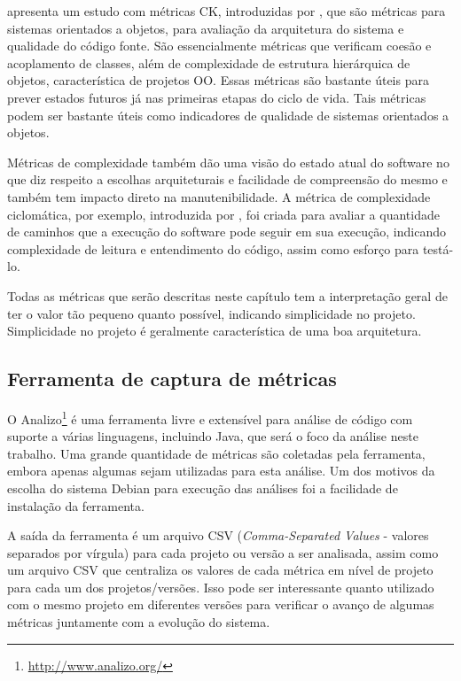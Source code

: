  apresenta um estudo com métricas CK, introduzidas por , que são métricas para sistemas orientados a objetos, para avaliação da arquitetura do sistema e qualidade do código fonte. São essencialmente métricas que verificam coesão e acoplamento de classes, além de complexidade de estrutura hierárquica de objetos, característica de projetos OO. Essas métricas são bastante úteis para prever estados futuros já nas primeiras etapas do ciclo de vida. Tais métricas podem ser bastante úteis como indicadores de qualidade de sistemas orientados a objetos\cite{ooasqualityindicators}.

Métricas de complexidade também dão uma visão do estado atual do software no que diz respeito a escolhas arquiteturais e facilidade de compreensão do mesmo e também tem impacto direto na manutenibilidade. A métrica de complexidade ciclomática, por exemplo, introduzida por , foi criada para avaliar a quantidade de caminhos que a execução do software pode seguir em sua execução, indicando complexidade de leitura e entendimento do código, assim como esforço para testá-lo.

Todas as métricas que serão descritas neste capítulo tem a interpretação geral de ter o valor tão pequeno quanto possível, indicando simplicidade no projeto. Simplicidade no projeto é geralmente característica de uma boa arquitetura.

\subsection{Ferramenta de captura de métricas}

O Analizo\footnote{\url{http://www.analizo.org/}} é uma ferramenta livre e extensível para análise de código com suporte a várias linguagens, incluindo Java, que será o foco da análise neste trabalho. Uma grande quantidade de métricas são coletadas pela ferramenta, embora apenas algumas sejam utilizadas para esta análise. Um dos motivos da escolha do sistema Debian para execução das análises foi a facilidade de instalação da ferramenta.

A saída da ferramenta é um arquivo CSV (\textit{Comma-Separated Values} - valores separados por vírgula) para cada projeto ou versão a ser analisada, assim como um arquivo CSV que centraliza os valores de cada métrica em nível de projeto para cada um dos projetos/versões. Isso pode ser interessante quanto utilizado com o mesmo projeto em diferentes versões para verificar o avanço de algumas métricas juntamente com a evolução do sistema.

